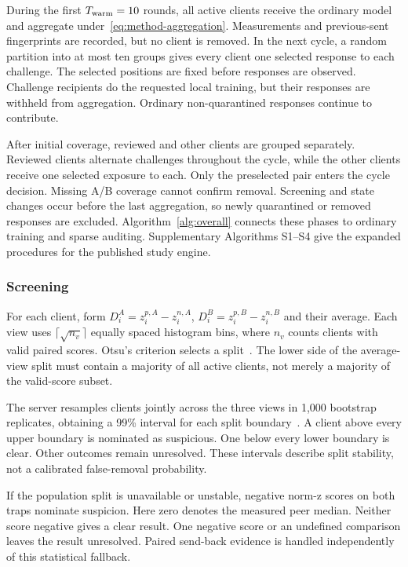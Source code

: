 \documentclass[journal]{IEEEtran}
\makeatletter
\renewcommand{\subsection}{\@startsection{subsection}{2}{\z@}{1.5ex}{0.7ex}{\normalfont\normalsize\itshape}}
\makeatother
\begin{document}
\subsection{Phases I and II: Warmup and Paired Coverage}
During the first $T_{\rm warm}=10$ rounds, all active clients receive the
ordinary model and aggregate under~\eqref{eq:method-aggregation}.
Measurements and previous-sent fingerprints are recorded, but no client
is removed. In the next cycle, a random partition into at most ten groups
gives every client one selected response to each challenge. The selected
positions are fixed before responses are observed. Challenge recipients
do the requested local training, but their responses are withheld from
aggregation. Ordinary non-quarantined responses continue to contribute.

After initial coverage, reviewed and other clients are grouped
separately. Reviewed clients alternate challenges throughout the cycle,
while the other clients receive one selected exposure to each. Only
the preselected pair enters the cycle decision. Missing A/B coverage
cannot confirm removal. Screening and state changes occur before the
last aggregation, so newly quarantined or removed responses are excluded.
Algorithm~\ref{alg:overall} connects these phases to ordinary training
and sparse auditing. Supplementary Algorithms S1--S4 give the expanded
procedures for the published study engine.

\subsubsection{Screening}
For each client, form $D_i^A=z_i^{p,A}-z_i^{n,A}$,
$D_i^B=z_i^{p,B}-z_i^{n,B}$ and their average. Each view uses
$\lceil\sqrt{n_v}\rceil$ equally spaced histogram bins, where $n_v$ counts
clients with valid paired scores. Otsu's criterion selects a
split~\cite{otsu1979threshold}. The lower side of the average-view split
must contain a majority of all active clients, not merely a majority of
the valid-score subset.

The server resamples clients jointly across the three views in 1,000
bootstrap replicates, obtaining a 99\% interval for each split
boundary~\cite{efron1979bootstrap}. A client above every upper boundary
is nominated as suspicious. One below every lower boundary is clear.
Other outcomes remain unresolved. These intervals describe split
stability, not a calibrated false-removal probability.

If the population split is unavailable or unstable, negative norm-z scores
on both traps nominate suspicion. Here zero denotes the measured peer
median. Neither score negative gives a clear result. One negative score
or an undefined comparison leaves the result unresolved. Paired send-back evidence is handled
independently of this statistical fallback.
\end{document}
